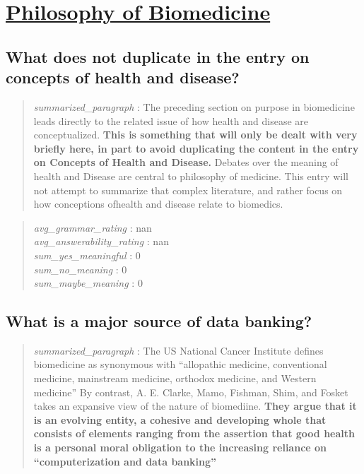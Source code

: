\hypertarget{philosophy-of-biomedicine}{%
\section{\texorpdfstring{\href{https://plato.stanford.edu/entries/biomedicine/index.html}{Philosophy
of
Biomedicine}}{Philosophy of Biomedicine}}\label{philosophy-of-biomedicine}}

\hypertarget{what-does-not-duplicate-in-the-entry-on-concepts-of-health-and-disease}{%
\subsection{What does not duplicate in the entry on concepts of health
and
disease?}\label{what-does-not-duplicate-in-the-entry-on-concepts-of-health-and-disease}}

\begin{quote}
\emph{summarized\_paragraph} : The preceding section on purpose in
biomedicine leads directly to the related issue of how health and
disease are conceptualized. \textbf{This is something that will only be
dealt with very briefly here, in part to avoid duplicating the content
in the entry on Concepts of Health and Disease.} Debates over the
meaning of health and Disease are central to philosophy of medicine.
This entry will not attempt to summarize that complex literature, and
rather focus on how conceptions ofhealth and disease relate to
biomedics.
\end{quote}

\begin{quote}
\emph{avg\_grammar\_rating} : nan\\
\emph{avg\_answerability\_rating} : nan\\
\emph{sum\_yes\_meaningful} : 0\\
\emph{sum\_no\_meaning} : 0\\
\emph{sum\_maybe\_meaning} : 0
\end{quote}

\hypertarget{what-is-a-major-source-of-data-banking}{%
\subsection{What is a major source of data
banking?}\label{what-is-a-major-source-of-data-banking}}

\begin{quote}
\emph{summarized\_paragraph} : The US National Cancer Institute defines
biomedicine as synonymous with ``allopathic medicine, conventional
medicine, mainstream medicine, orthodox medicine, and Western medicine''
By contrast, A. E. Clarke, Mamo, Fishman, Shim, and Fosket takes an
expansive view of the nature of biomediine. \textbf{They argue that it
is an evolving entity, a cohesive and developing whole that consists of
elements ranging from the assertion that good health is a personal moral
obligation to the increasing reliance on ``computerization and data
banking''}
\end{quote}

